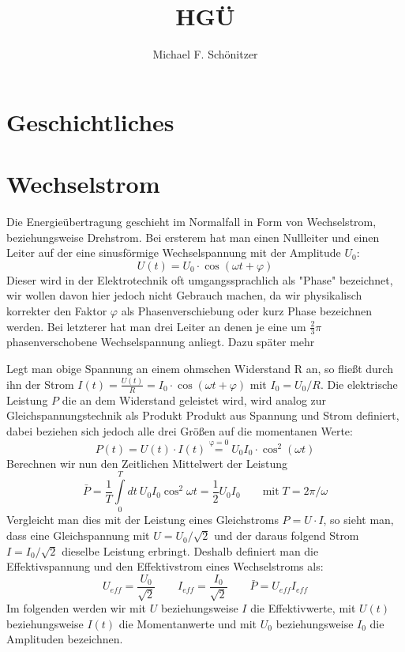 \documentclass[10pt,a4paper]{article}
\author{Michael F. Schönitzer}
\title{HGÜ}
\begin{document}
\maketitle

\section{Geschichtliches}

\section{Wechselstrom}
Die Energieübertragung geschieht im Normalfall in Form von Wechselstrom, beziehungsweise Drehstrom. %
Bei ersterem hat man einen Nullleiter und einen Leiter auf der eine sinusförmige Wechselspannung mit der Amplitude $U_0$:
\begin{equation}
U(t)=U_0 \cdot \cos(\omega t + \varphi)
\end{equation}
Dieser wird in der Elektrotechnik oft umgangssprachlich als "Phase" bezeichnet, wir wollen davon hier jedoch nicht Gebrauch machen, da wir physikalisch korrekter den Faktor $\varphi$ als Phasenverschiebung oder kurz Phase bezeichnen werden.
Bei letzterer hat man drei Leiter an denen je eine um $\frac23\pi$ phasenverschobene Wechselspannung anliegt. Dazu später mehr %

Legt man obige Spannung an einem ohmschen Widerstand R an, so fließt durch ihn der Strom $I(t)= \frac{U(t)}{R} = I_0 \cdot \cos(\omega t + \varphi)$ mit $I_0 = U_0/R$.
Die elektrische Leistung $P$ die an dem Widerstand geleistet wird, wird analog zur Gleichspannungstechnik als Produkt Produkt aus Spannung und Strom definiert, dabei beziehen sich jedoch alle drei Größen auf die momentanen Werte:
\begin{equation}
P(t) = U(t) \cdot I(t) \stackrel{\mathrm{\varphi=0}}= U_0 I_0 \cdot \cos^2(\omega t)
\end{equation}
Berechnen wir nun den Zeitlichen Mittelwert der Leistung
\begin{equation}
\bar{P}=\frac1T \int\limits_0^T dt\: U_0 I_0 \cos^2 \omega t = \frac12 U_0 I_0 \qquad\mathrm{mit}\; T=2\pi/\omega
\end{equation}
Vergleicht man dies mit der Leistung eines Gleichstroms $P=U\cdot I$, so sieht man, dass eine Gleichspannung mit $U=U_0 / \sqrt2$ und der daraus folgend Strom $I=I_0 / \sqrt2$ dieselbe Leistung erbringt.
Deshalb definiert man die Effektivspannung und den Effektivstrom eines Wechselstroms als:
\begin{equation*}
U_{eff} = \frac{U_0}{\sqrt2} \qquad I_{eff} = \frac{I_0}{\sqrt2} \qquad \bar{P}=U_{eff}I_{eff}
\end{equation*}
Im folgenden werden wir mit $U$ beziehungsweise $I$ die Effektivwerte, mit $U(t)$ beziehungsweise $I(t)$ die Momentanwerte und mit $U_0$ beziehungsweise $I_0$ die Amplituden bezeichnen.
\end{document}
